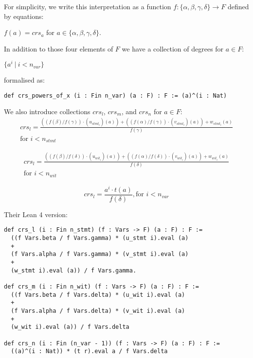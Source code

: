 \documentclass{article}
\theoremstyle{definition}
\theoremstyle{remark}
\begin{document}
For simplicity, we write this interpretation as a function $f :  \{ \alpha,\beta,\gamma, \delta \} \to F$ defined by equations:
\begin{center}
$f(a) = crs_{a}$ for $a \in \{ \alpha,\beta,\gamma, \delta \}$.
\end{center}

In addition to those four elements of $F$ we have a collection of degrees for $a \in F$:
\begin{center}
$\{ a^i \: | \: i < n_{var} \}$
\end{center}
formalised as:
\begin{lstlisting}
def crs_powers_of_x (i : Fin n_var) (a : F) : F := (a)^(i : Nat)
\end{lstlisting}

We also introduce collections $crs_l$, $crs_m$, and $crs_n$ for $a \in F$:
\begin{multline}
crs_l = \frac{((f(\beta) / f(\gamma)) \cdot (u_{{stmt}_i})(a)) + ((f(\alpha) / f(\gamma)) \cdot (v_{{stmt}_i})(a)) + w_{{stmt}_i}(a)}{f(\gamma)} \\ \text{for $i < n_{stmt}$}
\end{multline}

\begin{multline}
crs_l = \frac{((f(\beta) / f(\delta)) \cdot (u_{{wit}_i})(a)) + ((f(\alpha) / f(\delta)) \cdot (v_{{wit}_i})(a)) + w_{{wit}_i}(a)}{f(\delta)} \\ \text{for $i < n_{wit}$}
\end{multline}

\begin{equation}
crs_l = \frac{a^i \cdot t(a)}{f(\delta)}, \text{for $i < n_{var}$}
\end{equation}

Their Lean 4 version:

\begin{lstlisting}
def crs_l (i : Fin n_stmt) (f : Vars -> F) (a : F) : F :=
  ((f Vars.beta / f Vars.gamma) * (u_stmt i).eval (a)
  +
  (f Vars.alpha / f Vars.gamma) * (v_stmt i).eval (a)
  +
  (w_stmt i).eval (a)) / f Vars.gamma.

def crs_m (i : Fin n_wit) (f : Vars -> F) (a : F) : F :=
  ((f Vars.beta / f Vars.delta) * (u_wit i).eval (a)
  +
  (f Vars.alpha / f Vars.delta) * (v_wit i).eval (a)
  +
  (w_wit i).eval (a)) / f Vars.delta

def crs_n (i : Fin (n_var - 1)) (f : Vars -> F) (a : F) : F :=
  ((a)^(i : Nat)) * (t r).eval a / f Vars.delta
\end{lstlisting}
\end{document}
